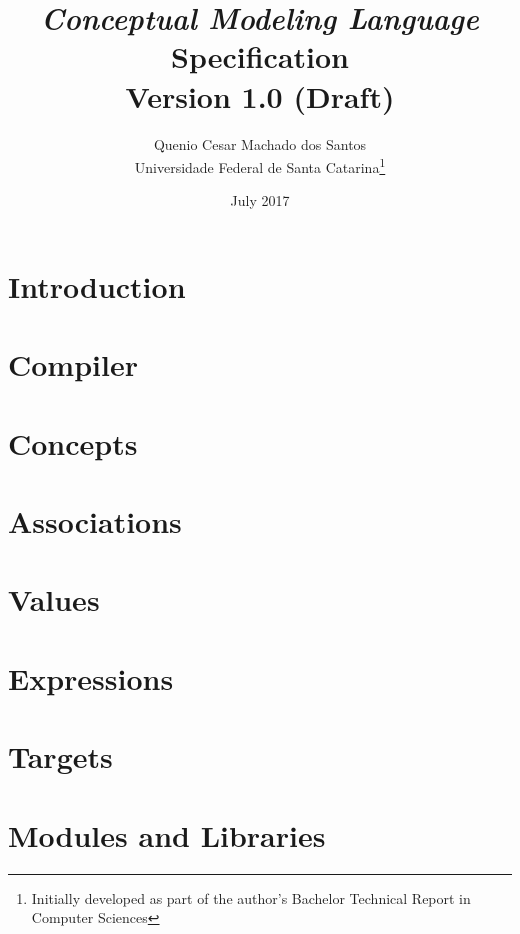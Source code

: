 \documentclass[a4paper,oneside,14pt, extrafontsizes]{memoir}
\title{\emph{Conceptual Modeling Language}\\Specification\\ \small{Version 1.0 (Draft)}}
\author{Quenio Cesar Machado dos Santos\\
\small{Universidade Federal de Santa Catarina}\thanks{
Initially developed as part of the author's Bachelor Technical Report in Computer Sciences}}
\date{July 2017}
\begin{document}
\begin{titlingpage}
\maketitle
\end{titlingpage}

\frontmatter

\begin{KeepFromToc}

\clearpage
\tableofcontents

\clearpage
\listoffigures

\clearpage
\listoftables

\end{KeepFromToc}

\mainmatter

\chapter{Introduction}


\chapter{Compiler}
\label{ch:compiler}


\chapter{Concepts}


\chapter{Associations}


\chapter{Values}


\chapter{Expressions}

\chapter{Targets}
\label{ch:targets}

\chapter{Modules and Libraries}
\end{document}
